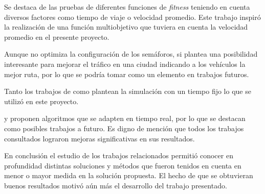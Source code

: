 Se destaca de \citet{Sanchez2010} las pruebas de diferentes funciones de \emph{fitness} teniendo en cuenta diversos factores como tiempo de viaje o velocidad promedio. Este trabajo inspiró la realización de una función multiobjetivo que tuviera en cuenta la velocidad promedio en el presente proyecto.

Aunque \citet{Stolfi2012} no optimiza la configuración de los semáforos, si plantea una posibilidad interesante para mejorar el tráfico en una ciudad indicando a los vehículos la mejor ruta, por lo que se podría tomar como un elemento en trabajos futuros.

Tanto los trabajos de \citet{Teo2010} como \citet{Stolfi2012} plantean la simulación con un tiempo fijo lo que se utilizó en este proyecto.

\citet{Montana1996} y \citet{Vogel2000}  proponen algoritmos que se adapten en tiempo real, por lo que se destacan como posibles trabajos a futuro.
Es digno de mención que todos los trabajos consultados lograron mejoras significativas en sus resultados.

En conclusión el estudio de los trabajos relacionados permitió conocer en profundidad distintas soluciones y métodos que fueron tenidos en cuenta en menor o mayor medida en la solución propuesta. El hecho de que se obtuvieran buenos resultados motivó aún más el desarrollo del trabajo presentado.





